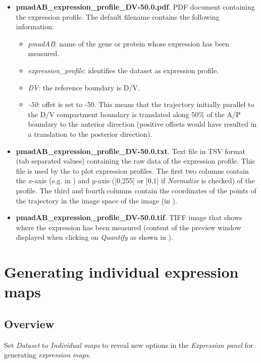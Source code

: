 \begin{itemize}
 \item \textbf{pmadAB\_expression\_profile\_DV-50.0.pdf}. PDF document containing the expression profile. The default filename contains the following information:
    \begin{itemize}
     \item \textit{pmadAB}: name of the gene or protein whose expression has been measured.
     \item \textit{expression\_profile}: identifies the dataset as expression profile.
     \item \textit{DV}: the reference boundary is D/V.
     \item \textit{-50}: offet is set to -50. This means that the trajectory initially parallel to the D/V compartment boundary is translated along 50\% of the A/P boundary to the anterior direction (positive offsets would have resulted in a translation to the posterior direction).
    \end{itemize}
 \item \textbf{pmadAB\_expression\_profile\_DV-50.0.txt}. Text file in TSV format (tab separated values) containing the raw data of the expression profile. This file is used by the \wingjMatlab to plot expression profiles. The first two columns contain the $x$-axis (e.g. in \mum) and $y$-axis ([0,255] or [0,1] if \textit{Normalize} is checked) of the profile. The third and fourth columns contain the coordinates of the points of the trajectory in the image space of the image (in \px).
 \item \textbf{pmadAB\_expression\_profile\_DV-50.0.tif}. TIFF image that shows where the expression has been measured (content of the preview window displayed when clicking on \textit{Quantify} as shown in ).
\end{itemize}

\section{Generating individual expression maps}\label{sec:expression_maps}
\subsection{Overview}
Set \textit{Dataset} to \textit{Individual maps} to reveal new options in the \emph{Expression panel} for generating \textit{expression maps}.\\


